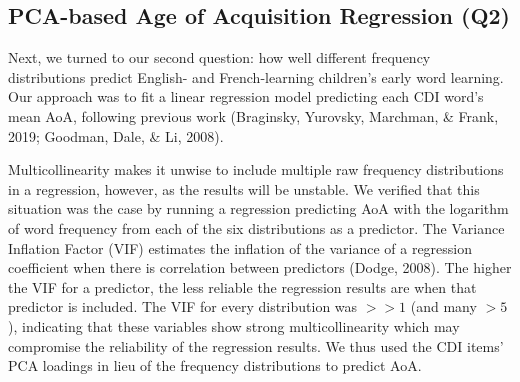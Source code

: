 \documentclass[10pt, letterpaper]{article}
\newenvironment{CodeChunk}{}{}
\begin{document}
\begin{CodeChunk}
\begin{table}
\begin{tabular}[t]{>{}l>{}r>{}r>{}r>{}r>{}r>{}r}
\cellcolor{white}{\textcolor{black}{PVar}} & \cellcolor{white}{\textcolor{black}{0.90}} & \cellcolor{white}{\textcolor{black}{0.04}} & \cellcolor{white}{\textcolor{black}{0.03}} & \cellcolor{white}{\textcolor{black}{0.02}} & \cellcolor{white}{\textcolor{black}{0.01}} & \cellcolor{white}{\textcolor{black}{0.00}}\\
\bottomrule
\end{tabular}
\end{table}

\end{CodeChunk}

\hypertarget{pca-based-age-of-acquisition-regression-q2}{%
\subsection{PCA-based Age of Acquisition Regression
(Q2)}\label{pca-based-age-of-acquisition-regression-q2}}

Next, we turned to our second question: how well different frequency
distributions predict English- and French-learning children's early word
learning. Our approach was to fit a linear regression model predicting
each CDI word's mean AoA, following previous work (Braginsky, Yurovsky,
Marchman, \& Frank, 2019; Goodman, Dale, \& Li, 2008).

Multicollinearity makes it unwise to include multiple raw frequency
distributions in a regression, however, as the results will be unstable.
We verified that this situation was the case by running a regression
predicting AoA with the logarithm of word frequency from each of the six
distributions as a predictor. The Variance Inflation Factor (VIF)
estimates the inflation of the variance of a regression coefficient when
there is correlation between predictors (Dodge, 2008). The higher the
VIF for a predictor, the less reliable the regression results are when
that predictor is included. The VIF for every distribution was \(>>1\)
(and many \(>5\)), indicating that these variables show strong
multicollinearity which may compromise the reliability of the regression
results. We thus used the CDI items' PCA loadings in lieu of the
frequency distributions to predict AoA.
\end{document}
